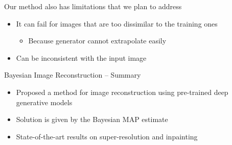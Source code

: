 \documentclass[8pt,xcolor=table,aspectratio=169]{beamer}
\begin{document}
\begin{frame}{Our method also has limitations that we plan to address}

\begin{itemize}
 \item It can fail for images that are too dissimilar to the training ones
 \begin{itemize}
 \item Because generator cannot extrapolate easily
 \end{itemize}
 \begin{center}
 \end{center}
 
 \item Can be inconsistent with the input image
 \begin{center}
 \end{center}
 
\end{itemize}
 
\end{frame}


\begin{frame}{Bayesian Image Reconstruction -- Summary}
 
 \begin{itemize}
  \item Proposed a method for image reconstruction using pre-trained deep generative models
  
  \vt
  
  \item Solution is given by the Bayesian MAP estimate
  
  \vt
  
  \item State-of-the-art results on super-resolution and inpainting
  
 \end{itemize}

 
\end{frame}
\end{document}
